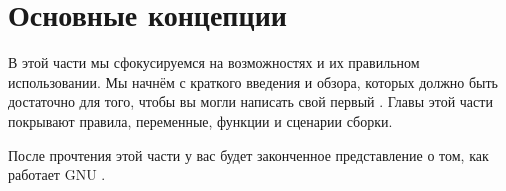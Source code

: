 \part{Основные концепции}
\label{part:basics}

В этой части мы сфокусируемся на возможностях \GNUmake{} и их
правильном использовании. Мы начнём с краткого введения и обзора,
которых должно быть достаточно для того, чтобы вы могли написать свой
первый \Makefile{}.  Главы этой части покрывают правила, переменные,
функции и сценарии сборки.

После прочтения этой части у вас будет законченное представление о
том, как работает GNU \GNUmake{}.






